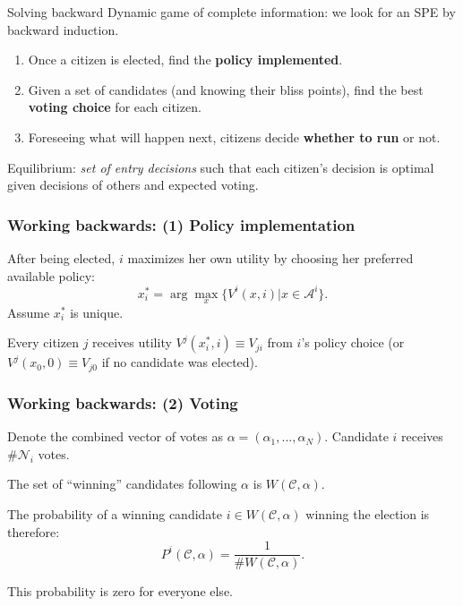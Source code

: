 \documentclass[11pt,aspectratio=169]{beamer}
\begin{document}
\begin{frame}{Solving backward}
Dynamic game of complete information: we look for an SPE by backward induction.

\begin{enumerate}
\item Once a citizen is elected, find the \textbf{policy implemented}.
\item Given a set of candidates (and knowing their bliss points), find the best \textbf{voting choice} for each citizen.
\item Foreseeing what will happen next, citizens decide \textbf{whether to run} or not.
\end{enumerate}

Equilibrium: \textit{set of entry decisions} such that each citizen's decision is optimal given decisions of others and expected voting.

\end{frame}


\begin{frame}
\frametitle{Working backwards: (1) Policy implementation}

After being elected, $i$ maximizes her own utility by choosing her preferred available policy: $$x^*_i = \arg \max_x \{ V^i(x,i)|x\in \mathcal{A}^i \}.$$ Assume $x^*_i$ is unique. %

\bigskip

Every citizen $j$ receives utility $V^j(x^*_i,i)\equiv V_{ji}$ from $i$'s policy choice (or $V^j(x_0,0)\equiv V_{j0}$ if no candidate was elected). 

\end{frame}



\begin{frame}
\frametitle{Working backwards: (2) Voting}

Denote the combined vector of votes as $\alpha = (\alpha_1,...,\alpha_N)$. Candidate $i$ receives $\#\mathcal{N}_i$ votes. 

\bigskip

The set of ``winning'' candidates following $\alpha$ is $W(\mathcal{C},\alpha)$. 

\bigskip

The probability of a winning candidate $i\in W(\mathcal{C},\alpha)$ winning the election is therefore: $$P^i(\mathcal{C},\alpha) = \frac{1}{\#W(\mathcal{C},\alpha)}.$$ 

\bigskip

This probability is zero for everyone else. 

\end{frame}
\end{document}
